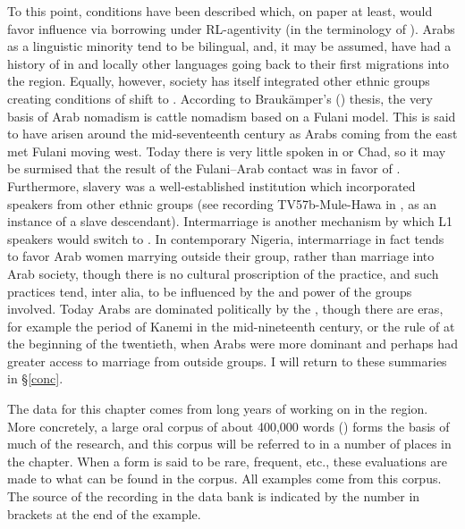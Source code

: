 \documentclass[output=paper]{langsci/langscibook}
\begin{document}
To this point, conditions have been described which, on paper at least, would favor influence via borrowing under RL-agentivity (in the terminology of \citealt{VanCoetsem1988,VanCoetsem2000}).  Arabs as a linguistic minority tend to be bilingual, and, it may be assumed, have had a history of  in  and locally other languages going back to their first migrations into the region. Equally, however,   society has itself integrated other ethnic groups creating conditions of shift to . According to Braukämper’s (\citeyear{Braukämper1994}) thesis, the very basis of  Arab nomadism is cattle nomadism based on a Fulani model. This is said to have arisen around the mid-seventeenth century as Arabs coming from the east met Fulani moving west. Today there is very little  spoken in  or Chad, so it may be surmised that the result of the Fulani--Arab contact was  in favor of . Furthermore, slavery was a well-established institution which incorporated speakers from other ethnic groups (see recording TV57b-Mule-Hawa in \citealt{OwensHassan2011}, as an instance of a slave descendant). Intermarriage is another mechanism by which L1 speakers would switch to . In contemporary Nigeria, intermarriage in fact tends to favor Arab women marrying outside their group, rather than marriage into Arab society, though there is no cultural proscription of the practice, and such practices tend, inter alia, to be influenced by the   and power of the groups involved. Today Arabs are dominated politically by the , though there are eras, for example the period of Kanemi in the mid-nineteenth century, or the rule of  at the beginning of the twentieth, when Arabs were more dominant and perhaps had greater access to marriage from outside groups. I will return to these summaries in §\ref{conc}.

The data for this chapter comes from long years of working on  in the  region. More concretely, a large oral corpus of about 400,000 words (\citealt{OwensHassan2011}) forms the basis of much of the research, and this corpus will be referred to in a number of places in the chapter. When a form is said to be rare, frequent, etc., these evaluations are made  to what can be found in the corpus. All examples come from this corpus. The source of the recording in the data bank is indicated by the number in brackets at the end of the example.
\end{document}
